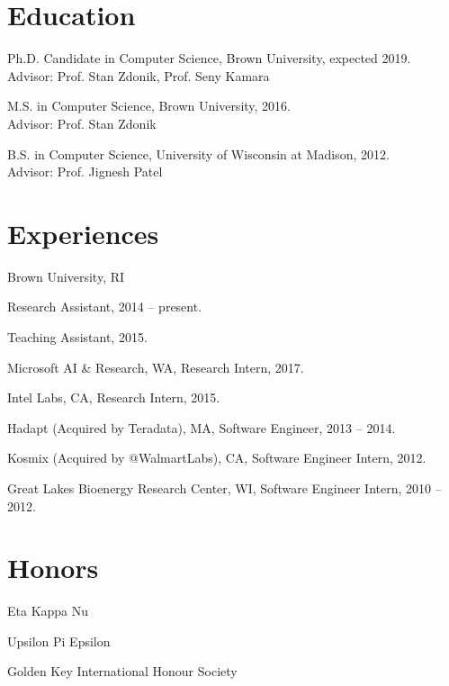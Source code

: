 \documentclass[letterpaper]{article}
\renewenvironment{itemize}{
  \begin{list}{}{
    \setlength{\leftmargin}{1.5em}
  }
}{
  \end{list}
}
\begin{document}
\section*{Education}

\begin{itemize}
  \item Ph.D. Candidate in Computer Science, Brown University, expected 2019.\\
  Advisor: Prof. Stan Zdonik, Prof. Seny Kamara
  \item M.S. in Computer Science, Brown University, 2016.\\
  Advisor: Prof. Stan Zdonik
  \item B.S. in Computer Science, University of Wisconsin at Madison, 2012.\\
  Advisor: Prof. Jignesh Patel
\end{itemize}


\section*{Experiences}

\begin{itemize}
\item Brown University, RI
	\begin{itemize}
		\item Research Assistant, 2014 -- present.
		\item Teaching Assistant, 2015.
	\end{itemize}
\item Microsoft AI \& Research, WA, Research Intern, 2017.
\item Intel Labs, CA, Research Intern, 2015.
\item Hadapt (Acquired by Teradata), MA, Software Engineer, 2013 -- 2014.
\item Kosmix (Acquired by @WalmartLabs), CA, Software Engineer Intern, 2012.
\item Great Lakes Bioenergy Research Center, WI, Software Engineer Intern, 2010 -- 2012.
\end{itemize}

\section*{Honors}
\begin{itemize}
\item Eta Kappa Nu
\item Upsilon Pi Epsilon
\item Golden Key International Honour Society
\end{itemize}
\end{document}
